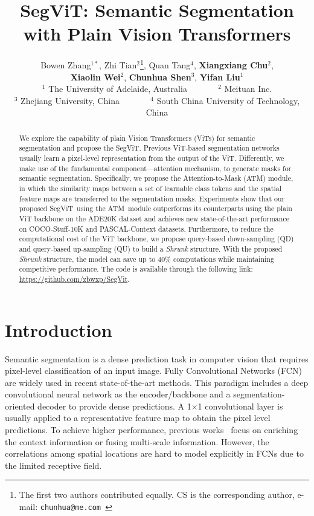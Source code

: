 \documentclass{article}
\title{SegViT: Semantic Segmentation with Plain Vision Transformers
}
\author{
   Bowen Zhang$^{1*}$,
\SP 
 Zhi Tian$^{2}$\thanks{The first two authors contributed equally.
CS is the corresponding author, e-mail: \tt chunhua@me.com
},
\SP  
 Quan Tang$^4$,
\SP
\textbf{Xiangxiang Chu}$^2$,
\\[0.051cm]
\textbf{Xiaolin Wei}$^2$,
\SP 
\textbf{Chunhua Shen}$^3$,
\SP
  \textbf{Yifan Liu}$^{1}$  
 \\ [0.285cm]
 $^1$ The University of Adelaide, Australia  ~ ~ ~ ~   $^2$ Meituan Inc.
 \\$^3$ Zhejiang University, China ~ ~ ~ ~   $^4$ South China University of Technology, China
}
\def\atm{ATM}
\def\seg{SegViT}
\begin{document}
\maketitle


\begin{abstract}


We explore the capability of plain
Vision Transformers (ViTs)
for semantic segmentation and propose the \seg. Previous ViT-based segmentation networks usually learn a pixel-level representation from the output of the ViT. Differently, we make use of the fundamental component---attention mechanism, to generate masks for semantic segmentation. Specifically, we propose the Attention-to-Mask (\atm) module, in which the similarity maps between a set of learnable class tokens and the spatial feature maps are transferred to the segmentation masks. 
Experiments show that our proposed \seg\ using the \atm\ module  
outperforms its counterparts using the plain ViT backbone on the ADE20K dataset and achieves new state-of-the-art performance on COCO-Stuff-10K and PASCAL-Context datasets. 
Furthermore, to reduce the computational cost of the ViT backbone, we propose query-based down-sampling (QD) and query-based up-sampling (QU) to build a \emph{Shrunk} structure.
With the proposed  \emph{Shrunk} structure, the model can save up to $40\%$ computations while maintaining competitive performance. The code is available through the following link: \url{https://github.com/zbwxp/SegVit}.










 





  
  
  
\end{abstract}


\section{Introduction}
Semantic segmentation is a dense prediction task in computer vision that requires pixel-level classification of an input image. 
Fully Convolutional Networks (FCN)~\cite{fcn} are widely used in recent state-of-the-art methods.
This paradigm includes a deep convolutional neural network as the encoder/backbone and a segmentation-oriented decoder to provide dense predictions. A 1$\times$1 convolutional layer is usually applied to a representative feature map to obtain the pixel level predictions. To achieve higher performance, previous works~\cite{chen2017deeplabv2, ocrnet,fpn} focus on enriching the context information or fusing multi-scale information. However, the correlations among spatial locations are hard to model explicitly in FCNs due to the limited receptive field.
\end{document}
